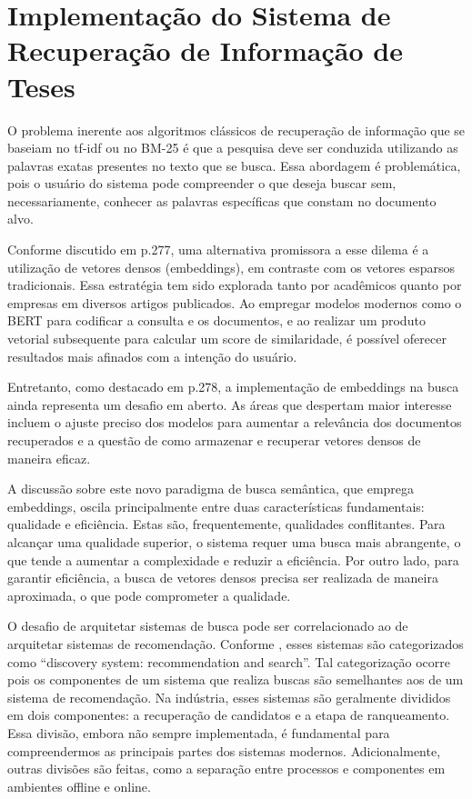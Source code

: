 \documentclass[
	12pt,				%
	openright,			%
	oneside,			%
	a4paper,			%
	english,			%
	french,				%
	spanish,			%
	brazil				%
	]{abntex2}
\begin{document}
\chapter{Implementação do Sistema de Recuperação de Informação de Teses}
\label{ch:implementacao-do-sistema-de-recuperacao-de-informacao-de-teses}

O problema inerente aos algoritmos clássicos de recuperação de informação que se baseiam no tf-idf ou no BM-25 é que a
pesquisa deve ser conduzida utilizando as palavras exatas presentes no texto que se busca.
Essa abordagem é problemática, pois o usuário do sistema pode compreender o que deseja buscar sem, necessariamente,
conhecer as palavras específicas que constam no documento alvo.

Conforme discutido em \citeauthor{JurafskyMartin2023} p.277, uma alternativa promissora a esse dilema é a utilização de vetores densos (embeddings),
em contraste com os vetores esparsos tradicionais.
Essa estratégia tem sido explorada tanto por acadêmicos quanto por empresas em diversos artigos publicados.
Ao empregar modelos modernos como o BERT para codificar a consulta e os documentos, e ao realizar um produto vetorial
subsequente para calcular um score de similaridade, é possível oferecer resultados mais afinados com a intenção do usuário.

Entretanto, como destacado em \citeauthor{JurafskyMartin2023} p.278, a implementação de embeddings na busca ainda representa um desafio em aberto.
As áreas que despertam maior interesse incluem o ajuste preciso dos modelos para aumentar a relevância dos documentos
recuperados e a questão de como armazenar e recuperar vetores densos de maneira eficaz.

A discussão sobre este novo paradigma de busca semântica, que emprega embeddings,
oscila principalmente entre duas características fundamentais: qualidade e eficiência.
Estas são, frequentemente, qualidades conflitantes. Para alcançar uma qualidade superior,
o sistema requer uma busca mais abrangente, o que tende a aumentar a complexidade e reduzir a eficiência.
Por outro lado, para garantir eficiência, a busca de vetores densos precisa ser realizada de maneira aproximada,
o que pode comprometer a qualidade.

O desafio de arquitetar sistemas de busca pode ser correlacionado ao de arquitetar sistemas de recomendação.
Conforme \citeauthor{yan2021system}, esses sistemas são categorizados como ``discovery system: recommendation and search''.
Tal categorização ocorre pois os componentes de um sistema que realiza buscas são semelhantes aos de um sistema de
recomendação.
Na indústria, esses sistemas são geralmente divididos em dois componentes: a recuperação de candidatos e a etapa de
ranqueamento.
Essa divisão, embora não sempre implementada, é fundamental para compreendermos as principais partes dos sistemas modernos.
Adicionalmente, outras divisões são feitas, como a separação entre processos e componentes em ambientes offline e online.
\end{document}
